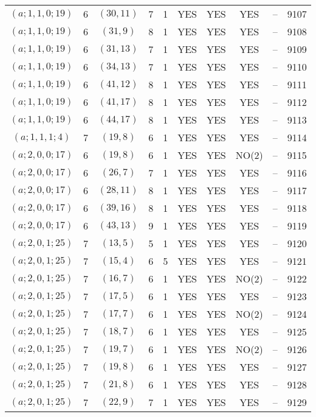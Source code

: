 \begin{longtable}{|c|c|c|c|c|c|c|c|c|c|}
$(a; 1, 1, 0; 19)$ & 6 & $(30, 11)$ & 7 & 1 & YES & YES & YES & -- & 9107\\
$(a; 1, 1, 0; 19)$ & 6 & $(31, 9)$ & 8 & 1 & YES & YES & YES & -- & 9108\\
$(a; 1, 1, 0; 19)$ & 6 & $(31, 13)$ & 7 & 1 & YES & YES & YES & -- & 9109\\
$(a; 1, 1, 0; 19)$ & 6 & $(34, 13)$ & 7 & 1 & YES & YES & YES & -- & 9110\\
$(a; 1, 1, 0; 19)$ & 6 & $(41, 12)$ & 8 & 1 & YES & YES & YES & -- & 9111\\
$(a; 1, 1, 0; 19)$ & 6 & $(41, 17)$ & 8 & 1 & YES & YES & YES & -- & 9112\\
$(a; 1, 1, 0; 19)$ & 6 & $(44, 17)$ & 8 & 1 & YES & YES & YES & -- & 9113\\
$(a; 1, 1, 1; 4)$ & 7 & $(19, 8)$ & 6 & 1 & YES & YES & YES & -- & 9114\\
$(a; 2, 0, 0; 17)$ & 6 & $(19, 8)$ & 6 & 1 & YES & YES & NO(2) & -- & 9115\\
$(a; 2, 0, 0; 17)$ & 6 & $(26, 7)$ & 7 & 1 & YES & YES & YES & -- & 9116\\
$(a; 2, 0, 0; 17)$ & 6 & $(28, 11)$ & 8 & 1 & YES & YES & YES & -- & 9117\\
$(a; 2, 0, 0; 17)$ & 6 & $(39, 16)$ & 8 & 1 & YES & YES & YES & -- & 9118\\
$(a; 2, 0, 0; 17)$ & 6 & $(43, 13)$ & 9 & 1 & YES & YES & YES & -- & 9119\\
$(a; 2, 0, 1; 25)$ & 7 & $(13, 5)$ & 5 & 1 & YES & YES & YES & -- & 9120\\
$(a; 2, 0, 1; 25)$ & 7 & $(15, 4)$ & 6 & 5 & YES & YES & YES & -- & 9121\\
$(a; 2, 0, 1; 25)$ & 7 & $(16, 7)$ & 6 & 1 & YES & YES & NO(2) & -- & 9122\\
$(a; 2, 0, 1; 25)$ & 7 & $(17, 5)$ & 6 & 1 & YES & YES & YES & -- & 9123\\
$(a; 2, 0, 1; 25)$ & 7 & $(17, 7)$ & 6 & 1 & YES & YES & NO(2) & -- & 9124\\
$(a; 2, 0, 1; 25)$ & 7 & $(18, 7)$ & 6 & 1 & YES & YES & YES & -- & 9125\\
$(a; 2, 0, 1; 25)$ & 7 & $(19, 7)$ & 6 & 1 & YES & YES & NO(2) & -- & 9126\\
$(a; 2, 0, 1; 25)$ & 7 & $(19, 8)$ & 6 & 1 & YES & YES & YES & -- & 9127\\
$(a; 2, 0, 1; 25)$ & 7 & $(21, 8)$ & 6 & 1 & YES & YES & YES & -- & 9128\\
$(a; 2, 0, 1; 25)$ & 7 & $(22, 9)$ & 7 & 1 & YES & YES & YES & -- & 9129\\

\end{longtable}
